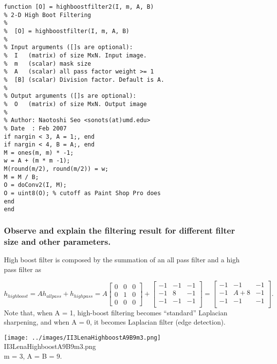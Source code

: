 \documentclass[article,oneside]{memoir}
\begin{document}
\begin{highboostfilter2.m}
\begin{verbatim}
function [O] = highboostfilter2(I, m, A, B)
% 2-D High Boot Filtering
%
%  [O] = highboostfilter(I, m, A, B)
%
% Input arguments ([]s are optional):
%  I   (matrix) of size MxN. Input image.
%  m   (scalar) mask size
%  A   (scalar) all pass factor weight >= 1
%  [B] (scalar) Division factor. Default is A. 
%
% Output arguments ([]s are optional):
%  O   (matrix) of size MxN. Output image
%
% Author: Naotoshi Seo <sonots(at)umd.edu>
% Date  : Feb 2007
if nargin < 3, A = 1;, end
if nargin < 4, B = A;, end
M = ones(m, m) * -1;
w = A + (m * m -1);
M(round(m/2), round(m/2)) = w;
M = M / B;
O = doConv2(I, M);
O = uint8(O); % cutoff as Paint Shop Pro does
end
end
\end{verbatim}

\subsubsection{Observe and explain the filtering result for different filter size and other parameters. }

High boost filter is composed by the summation of an all pass filter and a high pass filter as

$$ h_{highboost} = A h_{allpass} + h_{highpass} = A \left[ \begin{array}{ccc}
0 & 0 & 0 \\
0 & 1 & 0 \\
0 & 0 & 0 \end{array} \right] + \left[ \begin{array}{ccc}
-1 & -1 & -1 \\
-1 & 8 & -1 \\
-1 & -1 & -1 \\ \end{array} \right] = \left[ \begin{array}{ccc}
-1 & -1 & -1 \\
-1 & A+8 & -1 \\
-1 & -1 & -1 \\ \end{array} \right]. $$
Note that, when A = 1, high-boost filtering becomes "`standard"' Laplacian sharpening, and when A = 0, it becomes Laplacian filter (edge detection). 

\begin{center}
\texttt{[image: ../images/II3LenaHighboostA9B9m3.png]}\\
II3LenaHighboostA9B9m3.png\\
m = 3, A = B = 9. 
\end{center}


\end{highboostfilter2.m}
\end{document}
